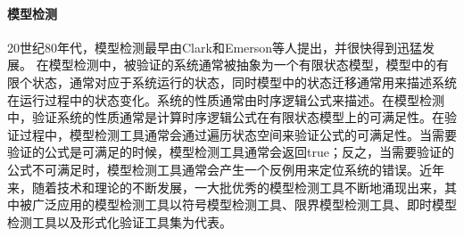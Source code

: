 \paragraph{模型检测}
20世纪80年代，模型检测\cite{CGP01,BouajjaniJNT00,BaierKatoen08}最早由Clark和Emerson等人提出，并很快得到迅猛发展。
在模型检测中，被验证的系统通常被抽象为一个有限状态模型，模型中的有限个状态，通常对应于系统运行的状态，同时模型中的状态迁移通常用来描述系统在运行过程中的状态变化。系统的性质通常由时序逻辑公式来描述。在模型检测中，验证系统的性质通常是计算时序逻辑公式在有限状态模型上的可满足性。在验证过程中，模型检测工具通常会通过遍历状态空间来验证公式的可满足性。当需要验证的公式是可满足的时候，模型检测工具通常会返回true；反之，当需要验证的公式不可满足时，模型检测工具通常会产生一个反例用来定位系统的错误。近年来，随着技术和理论的不断发展，一大批优秀的模型检测工具不断地涌现出来，其中被广泛应用的模型检测工具以符号模型检测工具\nusmv{}\cite{CimattiCGR99}、限界模型检测工具\verds{}\cite{Zhang14}、即时模型检测工具\cite{Holzmann97}以及形式化验证工具集\CADP{}\cite{GaravelLMS13}为代表。
